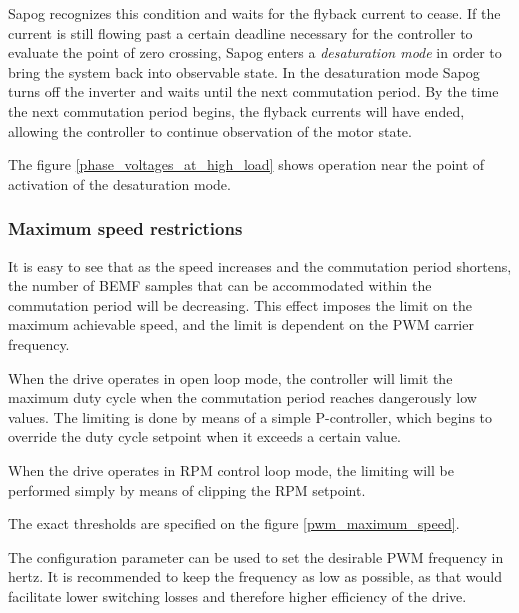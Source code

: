 \documentclass{zubaxdoc}
\begin{document}
Sapog recognizes this condition and waits for the flyback current to cease.
If the current is still flowing past a certain deadline necessary for the controller to evaluate the
point of zero crossing, Sapog enters a \emph{desaturation mode} in order to bring the system
back into observable state.
In the desaturation mode Sapog turns off the inverter and waits until the next commutation period.
By the time the next commutation period begins, the flyback currents will have ended,
allowing the controller to continue observation of the motor state.

The figure \ref{phase_voltages_at_high_load} shows operation near the point of activation
of the desaturation mode.

\subsubsection{Maximum speed restrictions}

It is easy to see that as the speed increases and the commutation period shortens,
the number of BEMF samples that can be accommodated within the commutation period will be decreasing.
This effect imposes the limit on the maximum achievable speed, and the limit is dependent on the PWM
carrier frequency.

When the drive operates in open loop mode, the controller will limit the maximum duty cycle
when the commutation period reaches dangerously low values.
The limiting is done by means of a simple P-controller,
which begins to override the duty cycle setpoint when it exceeds a certain value.

When the drive operates in RPM control loop mode, the limiting will be performed simply by means of
clipping the RPM setpoint.

The exact thresholds are specified on the figure \ref{pwm_maximum_speed}.

The configuration parameter  can be used to set the desirable PWM frequency
in hertz.
It is recommended to keep the frequency as low as possible,
as that would facilitate lower switching losses and therefore higher efficiency of the drive.
\end{document}
